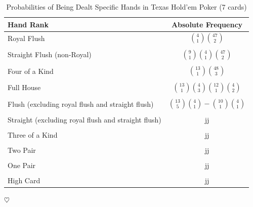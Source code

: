 \documentclass{article}
\begin{document}
\begin{table}[ht]
    \centering
    \caption{Probabilities of Being Dealt Specific Hands in Texas Hold'em Poker (7 cards)}
    \label{tab:poker_hands}
    \begin{tabularx}{\textwidth}{@{}Xc@{}} %
    \toprule
    Hand Rank                  & Absolute Frequency \\ \midrule
    Royal Flush                & $\displaystyle \binom{4}{1} \binom{47}{2}$       \\
    \\
    Straight Flush (non-Royal) & $\displaystyle \binom{9}{1} \binom{4}{1} \binom{47}{2}$          \\
    \\
    Four of a Kind             & $\displaystyle \binom{13}{1} \binom{48}{3}$           \\
    \\
    Full House                 & $\displaystyle \binom{13}{1} \binom{4}{3} \binom{12}{1} \binom{4}{2}$           \\
    \\
    Flush (excluding royal 
    flush and straight flush)  & $\displaystyle \binom{13}{5} \binom{4}{1} - \binom{10}{1} \binom{4}{1}$             \\
    \\
    Straight (excluding royal flush and straight flush)                  & jj           \\
    \\
    Three of a Kind            & jj            \\
    \\
    Two Pair                   & jj            \\
    \\
    One Pair                   & jj           \\
    \\
    High Card                  & jj           \\ \bottomrule
    \end{tabularx}
\end{table}

$\heartsuit$
\end{document}
